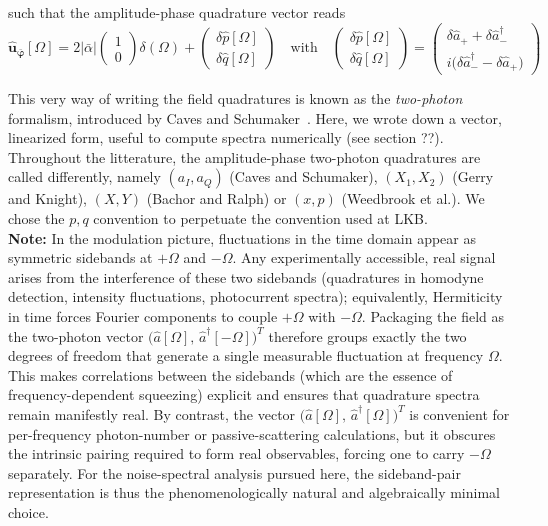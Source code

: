 such that the amplitude-phase quadrature vector reads
\begin{equation}
      \mathbf{\hat{u}_{\bar{\varphi}}}[\Omega]  = 2|\bar{\alpha}| \begin{pmatrix}
  1 \\[2pt]
  0
\end{pmatrix} \delta(\Omega) +
\begin{pmatrix}
  \delta \hat{p}[\Omega] \\[2pt]
\delta \hat{q}[\Omega]
\end{pmatrix}
\quad \text{with} \quad
  \begin{pmatrix}
  \delta \hat{p}[\Omega] \\[2pt]
\delta \hat{q}[\Omega]
\end{pmatrix} = \begin{pmatrix}
  \delta \hat{a}_+ + \delta \hat{a}^\dagger_-\\[2pt]
i\big(\delta \hat{a}^\dagger_- - \delta \hat{a}_+\big)  
\end{pmatrix}
\label{eq:2photons}
\end{equation}

This very way of writing the field quadratures is known as the \textit{two-photon} formalism, introduced by Caves and Schumaker~\cite{Caves1985,Caves1985a}. Here, we wrote down a vector, linearized form, useful to compute spectra numerically (see section ??). Throughout the litterature, the amplitude-phase two-photon quadratures are called differently, namely $(a_I, a_Q)$ (Caves and Schumaker), $(X_1, X_2)$ (Gerry and Knight), $(X, Y)$ (Bachor and Ralph) or $(x, p)$ (Weedbrook et al.). We chose the $p, q$ convention to perpetuate the convention used at LKB. \\

\noindent\textbf{Note: }
In the modulation picture, fluctuations in the time domain appear as symmetric sidebands at \(+\Omega\) and \(-\Omega\).
Any experimentally accessible, real signal arises from the interference of these two sidebands (quadratures in homodyne detection, intensity fluctuations, photocurrent spectra); equivalently, Hermiticity in time forces Fourier components to couple \(+\Omega\) with \(-\Omega\).
Packaging the field as the two-photon vector \(\big(\hat a[\Omega],\,\hat a^\dagger[-\Omega]\big)^{T}\) therefore groups exactly the two degrees of freedom that generate a single measurable fluctuation at frequency \(\Omega\). This makes correlations between the sidebands (which are the essence of frequency-dependent squeezing) explicit and ensures that quadrature spectra remain manifestly real. By contrast, the vector \(\big(\hat a[\Omega],\,\hat a^\dagger[\Omega]\big)^{T}\) is convenient for per-frequency photon-number or passive-scattering calculations, but it obscures the intrinsic pairing required to form real observables, forcing one to carry \(-\Omega\) separately.
For the noise-spectral analysis pursued here, the sideband-pair representation is thus the phenomenologically natural and algebraically minimal choice.


